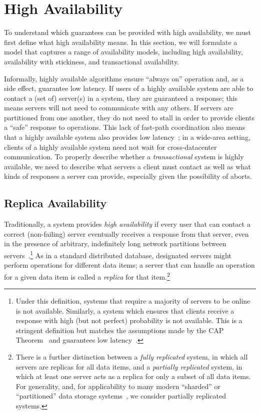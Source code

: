 
\section{High Availability}
\label{sec:availability}

To understand which guarantees can be provided with high availability,
we must first define what high availability means. In this section, we
will formulate a model that captures a range of availability models,
including high availability, availability with stickiness, and
transactional availability.

Informally, highly available algorithms ensure ``always on'' operation
and, as a side effect, guarantee low latency. If users of a highly
available system are able to contact a (set of) server(s) in a system,
they are guaranteed a response; this means servers will not need to
communicate with any others. If servers are partitioned from one
another, they do not need to stall in order to provide clients a
``safe'' response to operations. This lack of fast-path coordination
also means that a highly available system also provides low
latency~\cite{abadi-pacelc}; in a wide-area setting, clients of a
highly available system need not wait for cross-datacenter
communication. To properly describe whether a \textit{transactional}
system is highly available, we need to describe what servers a client
must contact as well as what kinds of responses a server can provide,
especially given the possibility of aborts.

\subsection{Replica Availability}

Traditionally, a system provides {\em high availability} if every user
that can contact a correct (non-failing) server eventually receives a
response from that server, even in the presence of arbitrary,
indefinitely long network partitions between
servers~\cite{gilbert-cap}.\footnote{Under this definition, systems
  that require a majority of servers to be online is not
  available. Similarly, a system which ensures that clients receive a
  response with high (but not perfect) probability is not
  available. This is a stringent definition but matches the
  assumptions made by the CAP Theorem~\cite{gilbert-cap} and
  guarantees low latency~\cite{abadi-pacelc}.} As in a standard
distributed database, designated servers might perform operations for
different data items; a server that can handle an operation for a
given data item is called a \textit{replica} for that
item.\footnote{There is a further distinction between a \textit{fully
    replicated} system, in which all servers are replicas for all data
  items, and a \textit{partially replicated} system, in which at least
  one server acts as a replica for only a subset of all data
  items. For generality, and, for applicability to many modern
  ``sharded'' or ``partitioned'' data storage systems~\cite{ bigtable,
    pnuts, spanner, dynamo, hstore}, we consider partially replicated
  systems.}

